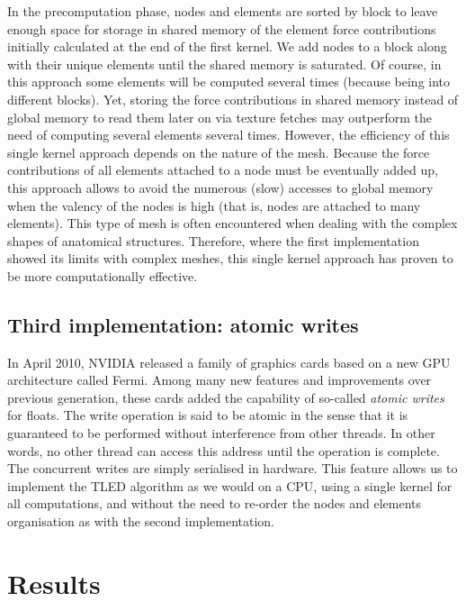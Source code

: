 In the precomputation phase, nodes and elements are sorted by block to leave enough space for storage in shared memory of the element force contributions initially calculated at the end of the first kernel. We add nodes to a block along with their unique elements until the shared memory is saturated. Of course, in this approach some elements will be computed several times (because being into different blocks). \ON Yet, \OFF storing the force contributions in shared memory instead of global memory to read them later on via texture fetches \ON may \OFF outperform the need of computing several elements several times. \ON However, the efficiency of this single kernel approach depends on the nature of the mesh. Because the force contributions of all elements attached to a node must be eventually added up, this approach allows to avoid the numerous (slow) accesses to global memory when the valency of the nodes is high (that is, nodes are attached to many elements). This type of mesh is often encountered when dealing with the complex shapes of anatomical structures. Therefore, where the first implementation showed its limits with complex meshes, this single kernel approach has proven to be more computationally effective. 
\OFF 


	\subsection{Third implementation: atomic writes}
In April 2010, NVIDIA released a family of graphics cards based on a new GPU architecture called Fermi. Among many new features and improvements over previous generation, these cards added the capability of so-called \emph{atomic writes} for floats. The write operation is said to be atomic in the sense that it is guaranteed to be performed without interference from other threads. In other words, no other thread can access this address until the operation is complete. The concurrent writes are simply serialised in hardware. This feature allows us to implement the TLED algorithm as we would on a CPU, using a single kernel for all computations, and without the need to re-order the nodes and elements organisation as with the second implementation. 


	
\section{Results}	

